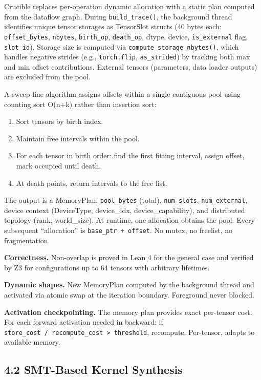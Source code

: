 Crucible replaces per-operation dynamic allocation with a static plan computed from the dataflow graph. During \texttt{build\_trace()}, the background thread identifies unique tensor storages as TensorSlot structs (40 bytes each: \texttt{offset\_bytes}, \texttt{nbytes}, \texttt{birth\_op}, \texttt{death\_op}, dtype, device, \texttt{is\_external} flag, \texttt{slot\_id}). Storage size is computed via \texttt{compute\_storage\_nbytes()}, which handles negative strides (e.g., \texttt{torch.flip}, \texttt{as\_strided}) by tracking both max and min offset contributions. External tensors (parameters, data loader outputs) are excluded from the pool.

A sweep-line algorithm assigns offsets within a single contiguous pool using counting sort O(n+k) rather than insertion sort:

\begin{enumerate}
\def\labelenumi{\arabic{enumi}.}
\tightlist
\item
  Sort tensors by birth index.
\item
  Maintain free intervals within the pool.
\item
  For each tensor in birth order: find the first fitting interval, assign offset, mark occupied until death.
\item
  At death points, return intervals to the free list.
\end{enumerate}

The output is a MemoryPlan: \texttt{pool\_bytes} (total), \texttt{num\_slots}, \texttt{num\_external}, device context (DeviceType, device\_idx, device\_capability), and distributed topology (rank, world\_size). At runtime, one allocation obtains the pool. Every subsequent ``allocation'' is \texttt{base\_ptr\ +\ offset}. No mutex, no freelist, no fragmentation.

\textbf{Correctness.} Non-overlap is proved in Lean 4 for the general case and verified by Z3 for configurations up to 64 tensors with arbitrary lifetimes.

\textbf{Dynamic shapes.} New MemoryPlan computed by the background thread and activated via atomic swap at the iteration boundary. Foreground never blocked.

\textbf{Activation checkpointing.} The memory plan provides exact per-tensor cost. For each forward activation needed in backward: if \texttt{store\_cost\ /\ recompute\_cost\ \textgreater{}\ threshold}, recompute. Per-tensor, adapts to available memory.

\subsection{4.2 SMT-Based Kernel Synthesis}\label{smt-based-kernel-synthesis}

